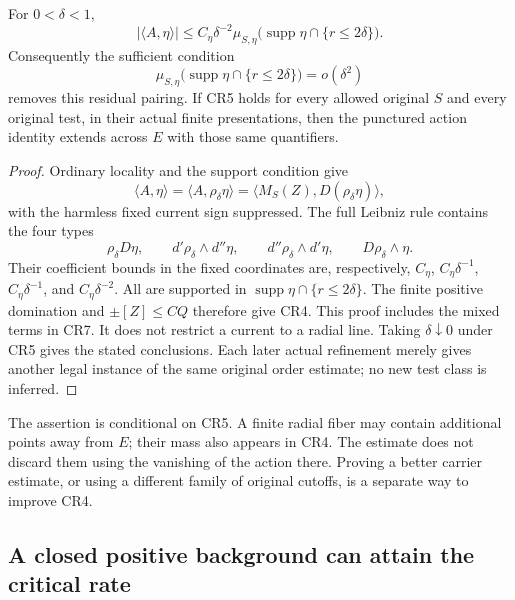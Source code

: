 \begin{proposition}
\label{prop:r13-quadratic-residual-mass-threshold}
For \(0<\delta<1\),
\[
 |\langle A,\eta\rangle|
       \le C_\eta\delta^{-2}
            \mu_{S,\eta}\bigl(\operatorname{supp}\eta
                                  \cap\{r\le2\delta\}\bigr).
\tag{CR4}
\]
Consequently the sufficient condition
\[
  \mu_{S,\eta}\bigl(\operatorname{supp}\eta
                      \cap\{r\le2\delta\}\bigr)=o(\delta^2)
\tag{CR5}
\]
removes this residual pairing.  If CR5 holds for every allowed
original \(S\) and every original test, in their actual finite
presentations, then the punctured action identity extends
across \(E\) with those same quantifiers.
\end{proposition}

\begin{proof}
Ordinary locality and the support condition give
\[
 \langle A,\eta\rangle
   =\langle A,\rho_\delta\eta\rangle
   =\langle M_S(Z),D(\rho_\delta\eta)\rangle,
\tag{CR6}
\]
with the harmless fixed current sign suppressed.  The full
Leibniz rule contains the four types
\[
 \rho_\delta D\eta,\qquad
 d'\rho_\delta\wedge d''\eta,\qquad
 d''\rho_\delta\wedge d'\eta,\qquad
 D\rho_\delta\wedge\eta.
\tag{CR7}
\]
Their coefficient bounds in the fixed coordinates are,
respectively, \(C_\eta\), \(C_\eta\delta^{-1}\),
\(C_\eta\delta^{-1}\), and \(C_\eta\delta^{-2}\).
All are supported in \(\operatorname{supp}\eta\cap\{r\le2\delta\}\).
The finite positive domination and \(\pm[Z]\le C Q\)
therefore give CR4.  This proof includes the mixed terms
in CR7.  It does not restrict a current to a radial line.
Taking \(\delta\downarrow0\) under CR5 gives the stated
conclusions.  Each later actual refinement merely gives
another legal instance of the same original order estimate;
no new test class is inferred.
\end{proof}

The assertion is conditional on CR5.  A finite radial fiber
may contain additional points away from \(E\); their mass
also appears in CR4.  The estimate does not discard them
using the vanishing of the action there.  Proving a better
carrier estimate, or using a different family of original
cutoffs, is a separate way to improve CR4.

\subsection{A closed positive background can attain the critical rate}

